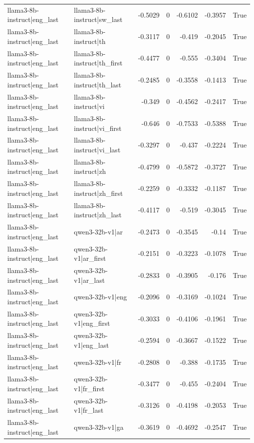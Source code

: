 \begin{table}
\begin{tabular}{l l r r r r l}
llama3-8b-instruct|eng_last & llama3-8b-instruct|sw_last & -0.5029 & 0 & -0.6102 & -0.3957 & True \\
llama3-8b-instruct|eng_last & llama3-8b-instruct|th & -0.3117 & 0 & -0.419 & -0.2045 & True \\
llama3-8b-instruct|eng_last & llama3-8b-instruct|th_first & -0.4477 & 0 & -0.555 & -0.3404 & True \\
llama3-8b-instruct|eng_last & llama3-8b-instruct|th_last & -0.2485 & 0 & -0.3558 & -0.1413 & True \\
llama3-8b-instruct|eng_last & llama3-8b-instruct|vi & -0.349 & 0 & -0.4562 & -0.2417 & True \\
llama3-8b-instruct|eng_last & llama3-8b-instruct|vi_first & -0.646 & 0 & -0.7533 & -0.5388 & True \\
llama3-8b-instruct|eng_last & llama3-8b-instruct|vi_last & -0.3297 & 0 & -0.437 & -0.2224 & True \\
llama3-8b-instruct|eng_last & llama3-8b-instruct|zh & -0.4799 & 0 & -0.5872 & -0.3727 & True \\
llama3-8b-instruct|eng_last & llama3-8b-instruct|zh_first & -0.2259 & 0 & -0.3332 & -0.1187 & True \\
llama3-8b-instruct|eng_last & llama3-8b-instruct|zh_last & -0.4117 & 0 & -0.519 & -0.3045 & True \\
llama3-8b-instruct|eng_last & qwen3-32b-v1|ar & -0.2473 & 0 & -0.3545 & -0.14 & True \\
llama3-8b-instruct|eng_last & qwen3-32b-v1|ar_first & -0.2151 & 0 & -0.3223 & -0.1078 & True \\
llama3-8b-instruct|eng_last & qwen3-32b-v1|ar_last & -0.2833 & 0 & -0.3905 & -0.176 & True \\
llama3-8b-instruct|eng_last & qwen3-32b-v1|eng & -0.2096 & 0 & -0.3169 & -0.1024 & True \\
llama3-8b-instruct|eng_last & qwen3-32b-v1|eng_first & -0.3033 & 0 & -0.4106 & -0.1961 & True \\
llama3-8b-instruct|eng_last & qwen3-32b-v1|eng_last & -0.2594 & 0 & -0.3667 & -0.1522 & True \\
llama3-8b-instruct|eng_last & qwen3-32b-v1|fr & -0.2808 & 0 & -0.388 & -0.1735 & True \\
llama3-8b-instruct|eng_last & qwen3-32b-v1|fr_first & -0.3477 & 0 & -0.455 & -0.2404 & True \\
llama3-8b-instruct|eng_last & qwen3-32b-v1|fr_last & -0.3126 & 0 & -0.4198 & -0.2053 & True \\
llama3-8b-instruct|eng_last & qwen3-32b-v1|ga & -0.3619 & 0 & -0.4692 & -0.2547 & True \\

\end{tabular}
\end{table}
